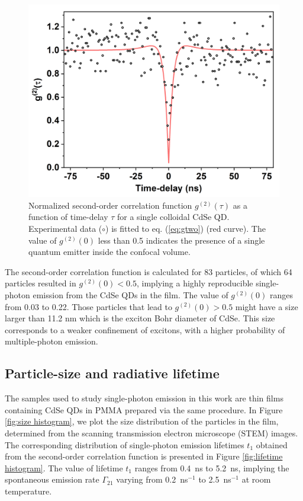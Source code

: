 \documentclass[%
 aip,
 amsmath,amssymb,
 reprint,%
]{revtex4-1}
\begin{document}
\begin{figure}
    \centering
    \includegraphics[width=0.85\linewidth]{g2 measuerment.png}
    \caption{Normalized second-order correlation function $g^{(2)}(\tau)$ as a function of time-delay $\tau$ for a single colloidal CdSe QD. Experimental data ($\circ$) is fitted to eq. (\ref{eq:gtwo}) (red curve). The value of $g^{(2)}(0)$ less than 0.5 indicates the presence of a single quantum emitter inside the confocal volume.}
    \label{fig:g2 measurement}
\end{figure}

The second-order correlation function is calculated for 83 particles, of which 64 particles resulted in $g^{(2)}(0) < 0.5$, implying a highly reproducible single-photon emission from the CdSe QDs in the film. The value of $g^{(2)}(0)$ ranges from 0.03 to 0.22. Those particles that lead to $g^{(2)}(0) > 0.5$ might have a size larger than 11.2 nm \cite{MM} which is the exciton Bohr diameter of CdSe. This size corresponds to a weaker confinement of excitons, with a higher probability of multiple-photon emission.



\subsection{Particle-size and radiative lifetime}
The samples used to study single-photon emission in this work are thin films containing CdSe QDs in PMMA prepared via the same procedure. In Figure \ref{fig:size histogram}, we plot the size distribution of the particles in the film, determined from the scanning transmission electron microscope (STEM) images. The corresponding distribution of single-photon emission lifetimes $t_1$ obtained from the second-order correlation function is presented in Figure \ref{fig:lifetime histogram}. The value of lifetime $t_1$ ranges from 0.4~ns to 5.2~ns, implying the spontaneous emission rate $\Gamma_{21}$ varying from 0.2~ns$^{-1}$ to 2.5~ns$^{-1}$ at room temperature. 
\end{document}
